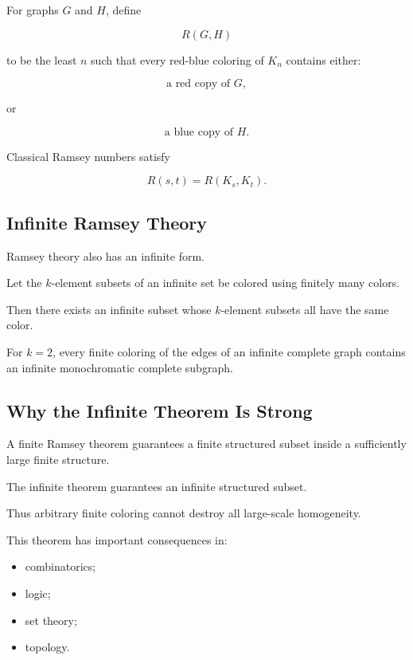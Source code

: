 For graphs \(G\) and \(H\), define

\[
\boxed{
R(G,H)
}
\]

to be the least \(n\) such that every red-blue coloring of \(K_n\)
contains either:

\[
\text{a red copy of }G,
\]

or

\[
\text{a blue copy of }H.
\]

Classical Ramsey numbers satisfy

\[
\boxed{
R(s,t)=R(K_s,K_t).
}
\]

\subsection{Infinite Ramsey Theory}
\label{subsec:infinite-ramsey}

Ramsey theory also has an infinite form.

\begin{theorem}
Let the \(k\)-element subsets of an infinite set be colored using
finitely many colors.

Then there exists an infinite subset whose \(k\)-element subsets all
have the same color.
\end{theorem}

For \(k=2\), every finite coloring of the edges of an infinite complete
graph contains an infinite monochromatic complete subgraph.

\subsection{Why the Infinite Theorem Is Strong}
\label{subsec:why-infinite-ramsey-strong}

A finite Ramsey theorem guarantees a finite structured subset inside a
sufficiently large finite structure.

The infinite theorem guarantees an infinite structured subset.

Thus arbitrary finite coloring cannot destroy all large-scale
homogeneity.

This theorem has important consequences in:

\begin{itemize}
    \item combinatorics;
    \item logic;
    \item set theory;
    \item topology.
\end{itemize}

